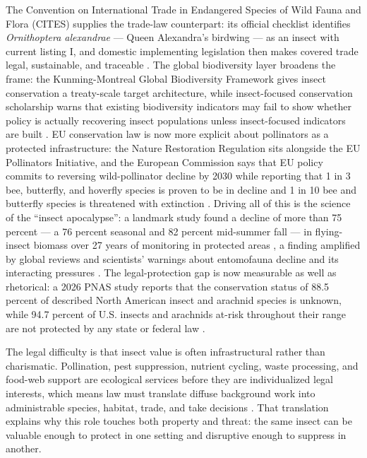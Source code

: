 \documentclass[
  english,
]{article}
\begin{document}
The Convention on International Trade in Endangered Species of Wild
Fauna and Flora (CITES) supplies the trade-law counterpart: its official
checklist identifies \emph{Ornithoptera alexandrae} --- Queen
Alexandra's birdwing --- as an insect with current listing I, and
domestic implementing legislation then makes covered trade legal,
sustainable, and traceable \citep{cites1973, cites_checklist2026}. The
global biodiversity layer broadens the frame: the Kunming-Montreal
Global Biodiversity Framework gives insect conservation a treaty-scale
target architecture, while insect-focused conservation scholarship warns
that existing biodiversity indicators may fail to show whether policy is
actually recovering insect populations unless insect-focused indicators
are built \citep{cbd_gbf2022, bladon2026gbf_insect_conservation}. EU
conservation law is now more explicit about pollinators as a protected
infrastructure: the Nature Restoration Regulation sits alongside the EU
Pollinators Initiative, and the European Commission says that EU policy
commits to reversing wild-pollinator decline by 2030 while reporting
that 1 in 3 bee, butterfly, and hoverfly species is proven to be in
decline and 1 in 10 bee and butterfly species is threatened with
extinction \citep{eu_nature_restoration2024, ec_pollinators2026}.
Driving all of this is the science of the ``insect apocalypse'': a
landmark study found a decline of more than 75 percent --- a 76 percent
seasonal and 82 percent mid-summer fall --- in flying-insect biomass
over 27 years of monitoring in protected areas \citep{hallmann2017}, a
finding amplified by global reviews and scientists' warnings about
entomofauna decline and its interacting pressures
\citep{sanchezbayo2019, wagner2021insectdecline, cardoso2020scientists_warning}.
The legal-protection gap is now measurable as well as rhetorical: a 2026
PNAS study reports that the conservation status of 88.5 percent of
described North American insect and arachnid species is unknown, while
94.7 percent of U.S. insects and arachnids at-risk throughout their
range are not protected by any state or federal law
\citep{esa_position2021, pnas2026insects}.

The legal difficulty is that insect value is often infrastructural
rather than charismatic. Pollination, pest suppression, nutrient
cycling, waste processing, and food-web support are ecological services
before they are individualized legal interests, which means law must
translate diffuse background work into administrable species, habitat,
trade, and take decisions \citep{losey2006economic_value_insects}. That
translation explains why this role touches both property and threat: the
same insect can be valuable enough to protect in one setting and
disruptive enough to suppress in another.
\end{document}
